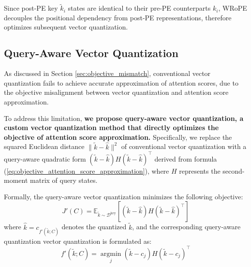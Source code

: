 Since post-PE key \(\tilde k_i\) states are identical to their pre-PE counterparts \(k_i\), WRoPE decouples the positional dependency from post-PE representations, therefore optimizes subsequent vector quantization.

\subsection{Query-Aware Vector Quantization}

\label{sec:query_aware_vq}

As discussed in Section \ref{sec:objective_mismatch}, conventional vector quantization fails to achieve accurate approximation of attention scores, due to the objective misalignment between vector quantization and attention score approximation. 

To address this limitation, \textbf{we propose query-aware vector quantization, a custom vector quantization method that directly optimizes the objective of attention score approximation. }
Specifically, we replace the squared Euclidean distance \(\|\tilde k - \hat k\|^2\) of conventional vector quantization with a query-aware quadratic form \((\tilde k - \hat k) H (\tilde k - \hat k)^\top\) derived from formula (\ref{eq:objective_attention_score_approximation}), where \(H\) represents the second-moment matrix of query states. 

Formally, the query-aware vector quantization minimizes the following objective:
\begin{equation}
    \label{eq:query_aware_vq}
    J'(C) = \mathbb E_{\tilde k \sim \mathcal {D^\mathrm{key}}} \left[(\tilde k - \hat k) H (\tilde k - \hat k)^\top\right]
\end{equation}
where \(\hat k = c_{f'(\tilde k; C)}\) denotes the quantized \(\tilde k\), and the corresponding query-aware quantization vector quantization is formulated as:
\begin{equation}
    f'(\tilde k; C) = \operatorname*{argmin}_j (\tilde k - c_j) H (\tilde k - c_j)^\top    
\end{equation}


